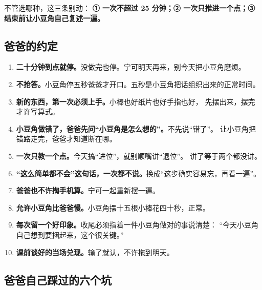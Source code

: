 \noindent 不管选哪种，这三条别动：
\textbf{① 一次不超过 25 分钟；② 一次只推进一个点；③ 结束前让小豆角自己复述一遍。}

\subsection{爸爸的约定}

\begin{enumerate}
  \item \textbf{二十分钟到点就停。}没做完也停。宁可明天再来，别今天把小豆角磨烦。
  \item \textbf{不抢答。}小豆角停五秒爸爸才开口。五秒是小豆角把话组织出来的正常时间。
  \item \textbf{新的东西，第一次必须上手。}小棒也好纸片也好手指也好，
        先摆出来，摆完才许写算式。
  \item \textbf{小豆角做错了，爸爸先问“小豆角是怎么想的”。}不先说“错了”。
        让小豆角把错路走完，爸爸才知道断在哪。
  \item \textbf{一次只教一个点。}今天搞“进位”，就别顺嘴讲“退位”。
        讲了等于两个都没讲。
  \item \textbf{“这么简单都不会”这句话，一次都不说。}换成“这步确实容易忘，再看一遍”。
  \item \textbf{爸爸也不许掏手机算。}宁可一起重新摆一遍。
  \item \textbf{允许小豆角比爸爸慢。}小豆角摆十五根小棒花四十秒，正常。
  \item \textbf{每次留一个好印象。}收尾必须指着一件小豆角做对的事说清楚：
        “今天小豆角自己想到要捆起来，这个很关键。”
  \item \textbf{课前谈好的当场兑现。}输了就认，不许拖到明天。
\end{enumerate}


\subsection{爸爸自己踩过的六个坑}

